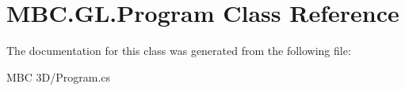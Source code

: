 \hypertarget{class_m_b_c_1_1_g_l_1_1_program}{\section{M\-B\-C.\-G\-L.\-Program Class Reference}
\label{class_m_b_c_1_1_g_l_1_1_program}
}


The documentation for this class was generated from the following file\-:\begin{DoxyCompactItemize}
\item 
M\-B\-C 3\-D/Program.\-cs\end{DoxyCompactItemize}

